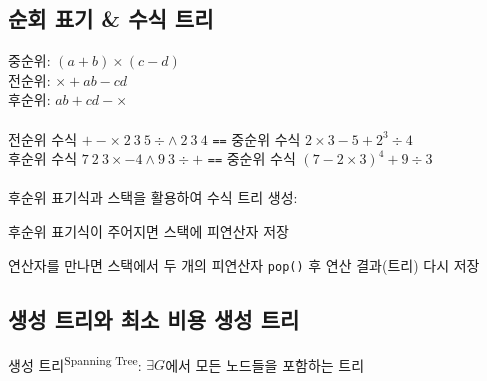 \subsection{순회 표기 \& 수식 트리}
중순위: $(a+b)\times(c-d)$\\
전순위: $\times + ab-cd$\\
후순위: $ab+cd-\times$\\\\
전순위 수식 $+-\times\ 2\ 3\ 5 \div \wedge\  2\ 3\ 4$ \texttt{==} 중순위 수식 $2 \times 3 - 5 + 2^3 \div 4$\\
후순위 수식 $7\ 2\ 3\times - 4 \wedge 9\ 3 \div +$ \texttt{==} 중순위 수식 $(7 - 2 \times 3)^4 + 9 \div 3$
\\\\
후순위 표기식과 스택을 활용하여 수식 트리 생성:

후순위 표기식이 주어지면 스택에 피연산자 저장

연산자를 만나면 스택에서 두 개의 피연산자 \texttt{pop()} 후 연산 결과(트리) 다시 저장

\subsection{생성 트리와 최소 비용 생성 트리}
생성 트리\textsuperscript{Spanning Tree}: $\exists G$에서 모든 노드들을 포함하는 트리

